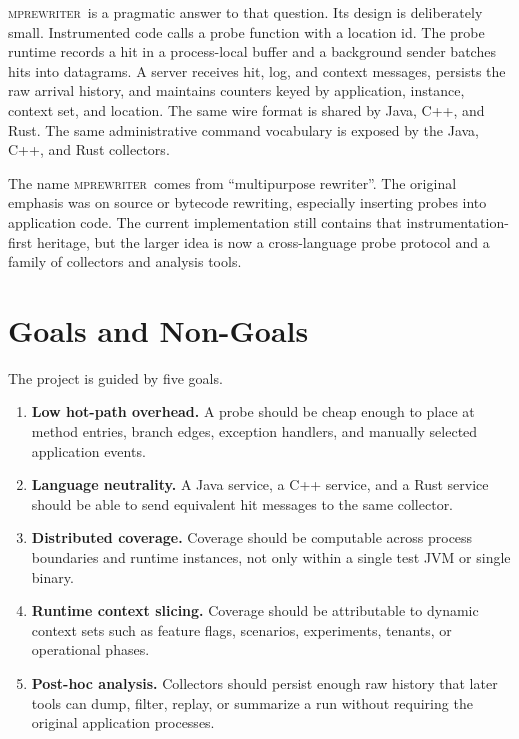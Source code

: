 \documentclass[11pt]{article}
\newcommand{\tool}{\textsc{mprewriter}}
\begin{document}
\tool\ is a pragmatic answer to that question. Its design is deliberately
small. Instrumented code calls a probe function with a location id. The probe
runtime records a hit in a process-local buffer and a background sender batches
hits into datagrams. A server receives hit, log, and context messages, persists
the raw arrival history, and maintains counters keyed by application,
instance, context set, and location. The same wire format is shared by Java,
C++, and Rust. The same administrative command vocabulary is exposed by the
Java, C++, and Rust collectors.

The name \tool\ comes from ``multipurpose rewriter''. The original emphasis was
on source or bytecode rewriting, especially inserting probes into application
code. The current implementation still contains that instrumentation-first
heritage, but the larger idea is now a cross-language probe protocol and a
family of collectors and analysis tools.

\section{Goals and Non-Goals}

The project is guided by five goals.

\begin{enumerate}
  \item \textbf{Low hot-path overhead.} A probe should be cheap enough to place
  at method entries, branch edges, exception handlers, and manually selected
  application events.

  \item \textbf{Language neutrality.} A Java service, a C++ service, and a Rust
  service should be able to send equivalent hit messages to the same collector.

  \item \textbf{Distributed coverage.} Coverage should be computable across
  process boundaries and runtime instances, not only within a single test JVM
  or single binary.

  \item \textbf{Runtime context slicing.} Coverage should be attributable to
  dynamic context sets such as feature flags, scenarios, experiments, tenants,
  or operational phases.

  \item \textbf{Post-hoc analysis.} Collectors should persist enough raw
  history that later tools can dump, filter, replay, or summarize a run without
  requiring the original application processes.
\end{enumerate}
\end{document}
